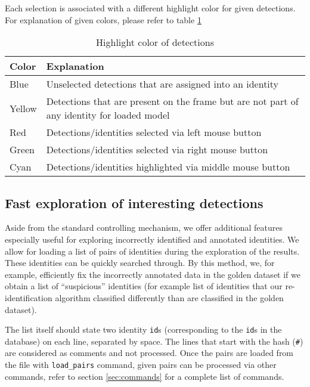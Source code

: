Each selection is associated with a different highlight color for given detections.
For explanation of given colors, please refer to table \ref{tab:annotation_highlight}

\begin{table}[]
    \centering
    \begin{tabularx}{\textwidth}{l|X}
         \textbf{Color} & \textbf{Explanation} \\ \hline
         Blue & Unselected detections that are assigned into an identity \\ \hline
         Yellow & Detections that are present on the frame but are not part of any
         identity for loaded model \\ \hline
         Red & Detections/identities selected via left mouse button \\ \hline
         Green & Detections/identities selected via right mouse button \\ \hline
         Cyan & Detections/identities highlighted via middle mouse button \\
    \end{tabularx}
    \caption{Highlight color of detections}
    \label{tab:annotation_highlight}
\end{table}

\subsection{Fast exploration of interesting detections}

\label{subsec:exploration}

Aside from the standard controlling mechanism, we offer additional features especially
useful for exploring incorrectly identified and annotated identities. We allow
for loading a list of pairs of identities during the exploration of the results. These
identities can be quickly searched through. By this method, we, for example, efficiently fix the incorrectly annotated data in the golden dataset if we obtain a list of ``suspicious'' identities (for example list of identities that our re-identification algorithm classified differently than are classified in the golden dataset).

The list itself should state two identity \verb+id+s (corresponding to the \verb+id+s in the
database) on each line, separated by space. The lines that start with the hash (\verb+#+) are considered as comments and not processed. Once the pairs are loaded
from the file with \verb+load_pairs+ command, given pairs can be processed via other
commands, refer to section \ref{sec:commands} for a complete list of commands.


